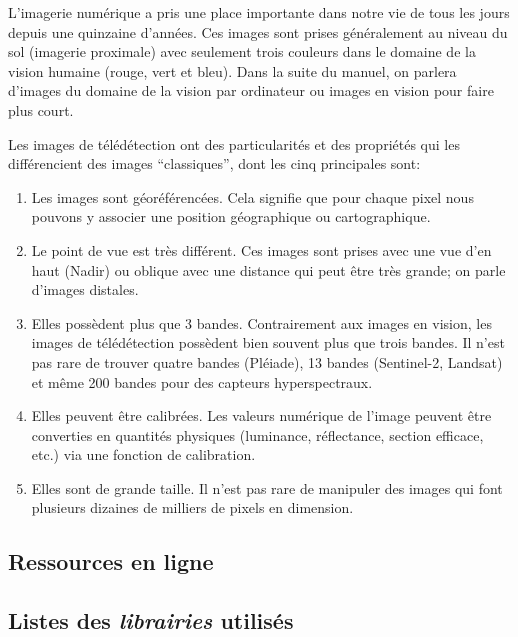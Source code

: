 \documentclass[
  french,
  11pt,
  letterpaper,
  open=any,
  twoside=false,
  french]{scrbook}
\begin{document}

L'imagerie numérique a pris une place importante dans notre vie de tous
les jours depuis une quinzaine d'années. Ces images sont prises
généralement au niveau du sol (imagerie proximale) avec seulement trois
couleurs dans le domaine de la vision humaine (rouge, vert et bleu).
Dans la suite du manuel, on parlera d'images du domaine de la vision par
ordinateur ou images en vision pour faire plus court.

Les images de télédétection ont des particularités et des propriétés qui
les différencient des images ``classiques'', dont les cinq principales
sont:

\begin{enumerate}
\def\labelenumi{\arabic{enumi}.}
\item
  Les images sont géoréférencées. Cela signifie que pour chaque pixel
  nous pouvons y associer une position géographique ou cartographique.
\item
  Le point de vue est très différent. Ces images sont prises avec une
  vue d'en haut (Nadir) ou oblique avec une distance qui peut être très
  grande; on parle d'images distales.
\item
  Elles possèdent plus que 3 bandes. Contrairement aux images en vision,
  les images de télédétection possèdent bien souvent plus que trois
  bandes. Il n'est pas rare de trouver quatre bandes (Pléiade), 13
  bandes (Sentinel-2, Landsat) et même 200 bandes pour des capteurs
  hyperspectraux.
\item
  Elles peuvent être calibrées. Les valeurs numérique de l'image peuvent
  être converties en quantités physiques (luminance, réflectance,
  section efficace, etc.) via une fonction de calibration.
\item
  Elles sont de grande taille. Il n'est pas rare de manipuler des images
  qui font plusieurs dizaines de milliers de pixels en dimension.
\end{enumerate}

\subsection*{Ressources en ligne}\label{ressources-en-ligne}

\subsection*{\texorpdfstring{Listes des \emph{librairies}
utilisés}{Listes des librairies utilisés}}\label{sect0071}
\end{document}
